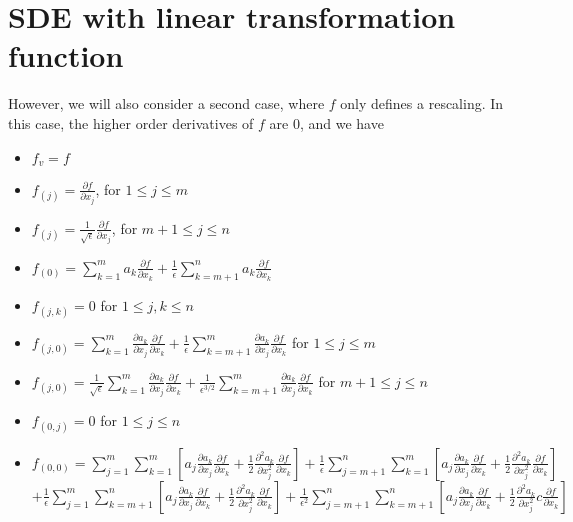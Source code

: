 \documentclass[12pt]{article}
\begin{document}
\section{SDE with linear transformation function}

However, we will also consider a second case, where $f$ only defines a rescaling.
%
In this case, the higher order derivatives of $f$ are 0, and we have
%
\begin{itemize}
\item $f_v = f$
%
\item $f_{(j)} = \frac{\partial f}{\partial x_j}$, for $1 \le j \le m$
\item $f_{(j)} = \frac{1}{\sqrt{\epsilon}} \frac{\partial f}{\partial x_j}$, for $m+1 \le j \le n$
%
\item $f_{(0)} = \sum_{k=1}^m a_k \frac{\partial f}{\partial x_k}
+ \frac{1}{\epsilon} \sum_{k=m+1}^n a_k \frac{\partial f}{\partial x_k}$
%
\item $f_{(j, k)} =  0  $ for $1 \le j,k \le n$
%
\item $f_{(j,0)} = \sum_{k=1}^m \frac{\partial a_k}{\partial x_j} \frac{\partial f}{\partial x_k}  + \frac{1}{\epsilon} \sum_{k=m+1}^m \frac{\partial a_k }{\partial x_j} \frac{\partial f}{\partial x_k}$ for $1 \le j \le m$
\item $f_{(j,0)} = \frac{1}{\sqrt{\epsilon}} \sum_{k=1}^m \frac{\partial a_k }{\partial x_j} \frac{\partial f}{\partial x_k}  + \frac{1}{\epsilon^{3/2}} \sum_{k=m+1}^m \frac{\partial a_k}{\partial x_j} \frac{\partial f}{\partial x_k}$ for $m+1 \le j \le n$
%
\item $f_{(0, j)} =0 $ for $1 \le j \le n$
%
\item $f_{(0,0)}  = \sum_{j=1}^m \sum_{k=1}^m \left[ a_j \frac{\partial a_k}{\partial x_j} \frac{\partial f}{\partial x_k} + \frac{1}{2} \frac{\partial^2 a_k}{\partial x_j^2} \frac{\partial f}{\partial x_k} \right] 
+ \frac{1}{\epsilon} \sum_{j=m+1}^n \sum_{k=1}^m \left[ a_j \frac{\partial a_k}{\partial x_j} \frac{\partial f}{\partial x_k} + \frac{1}{2} \frac{\partial^2 a_k}{\partial x_j^2} \frac{\partial f}{\partial x_k} \right] $\\
$+ \frac{1}{\epsilon} \sum_{j=1}^m \sum_{k= m+1}^n \left[ a_j \frac{\partial a_k}{\partial x_j} \frac{\partial f}{\partial x_k} + \frac{1}{2} \frac{\partial^2 a_k}{\partial x_j^2} \frac{\partial f}{\partial x_k} \right] 
+ \frac{1}{\epsilon^2} \sum_{j=m+1}^n \sum_{k=m+1}^n \left[ a_j \frac{\partial a_k}{\partial x_j} \frac{\partial f}{\partial x_k} + \frac{1}{2} \frac{\partial^2 a_k}{\partial x_j^2} c\frac{\partial f}{\partial x_k}\right]  $
\end{itemize}
\end{document}
